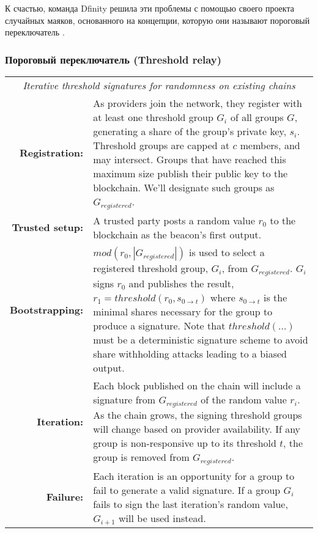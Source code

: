 \documentclass[russian,english,11pt]{article}
\begin{document}
К счастью, команда Dfinity решила эти проблемы с помощью своего 
проекта случайных маяков, основанного на концепции, которую они 
называют пороговый переключатель \cite{thresholdRelay}.

\subsubsection{Пороговый переключатель (Threshold relay)}

\begin{table*}[t]
  \centering
  \begin{tabular}{|rp{10cm}|}
  \hline
  \multicolumn{2}{|c|}{\textit{Iterative threshold signatures for
  randomness on existing chains}} \\
  \textbf{Registration:} & As providers join the network, they
  register with at least one threshold group $G_i$ of all groups $G$,
  generating a share of the group's private key, $s_i$. Threshold groups are
  capped at $c$ members, and may intersect. Groups that have reached
  this maximum size publish their public key to the blockchain. We'll
  designate such groups as $G_{registered}$. \\
  \textbf{Trusted setup:} & A trusted party posts a random value
  $r_0$ to the blockchain as the beacon's first output. \\
  \textbf{Bootstrapping:} & $mod(r_{0}, |G_{registered}|)$ is
  used to select a registered threshold group, $G_i$, from
  $G_{registered}$. $G_i$ signs $r_0$ and publishes the
  result, $r_1 = threshold(r_0, s_{0\rightarrow{t}})$ where
  $s_{0\rightarrow{t}}$ is the minimal shares necessary for the group
  to produce a signature. Note that $threshold(...)$ must be a
  deterministic signature scheme to avoid share withholding attacks
  leading to a biased output. \\
  \textbf{Iteration:} & Each block published on the chain will include
  a signature from $G_{registered}$ of the random value $r_i$. As the
  chain grows, the signing threshold groups will change based on
  provider availability. If any group is non-responsive up to its
  threshold $t$, the group is removed from $G_{registered}$. \\
  \textbf{Failure:} & Each iteration is an opportunity for a
  group to fail to generate a valid signature. If a group $G_i$ fails
  to sign the last iteration's random value, $G_{i+1}$ will be used
  instead. \\
  \hline
\end{tabular}
\end{table*}
\end{document}
